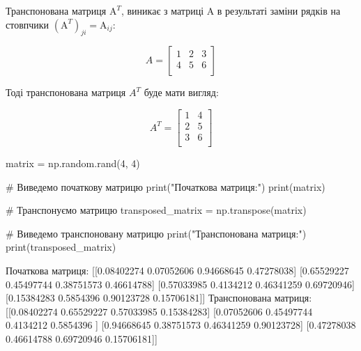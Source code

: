 \documentclass[]{article}
\newcounter{pythoncode}
\begin{document}
Транспонована матриця \(\mathrm{A}^T\), виникає з матриці \(\mathrm{A}\)
в результаті заміни рядків на стовпчики $(\mathrm{A}^{T})_{ji} =
	\mathrm{A}_{ij} $:

\[A =
	\begin{bmatrix}
		1 & 2 & 3 \\
		4 & 5 & 6 \\
	\end{bmatrix}
\]

Тоді транспонована матриця $ A^{T} $ буде мати вигляд:

\[
	A^T =
	\begin{bmatrix}
		1 & 4 \\
		2 & 5 \\
		3 & 6 \\
	\end{bmatrix}
\]

\begin{pythoncode}
    matrix = np.random.rand(4, 4)

    # Виведемо початкову матрицю
    print("Початкова матриця:")
    print(matrix)

    # Транспонуємо матрицю
    transposed_matrix = np.transpose(matrix)

    # Виведемо транспоновану матрицю
    print("Транспонована матриця:")
    print(transposed_matrix)
\end{pythoncode}

\begin{out}
	Початкова матриця:
	[[0.08402274 0.07052606 0.94668645 0.47278038]
	 [0.65529227 0.45497744 0.38751573 0.46614788]
	 [0.57033985 0.4134212  0.46341259 0.69720946]
	 [0.15384283 0.5854396  0.90123728 0.15706181]]
	Транспонована матриця:
	[[0.08402274 0.65529227 0.57033985 0.15384283]
	 [0.07052606 0.45497744 0.4134212  0.5854396 ]
	 [0.94668645 0.38751573 0.46341259 0.90123728]
	 [0.47278038 0.46614788 0.69720946 0.15706181]]
\end{out}
\end{document}
